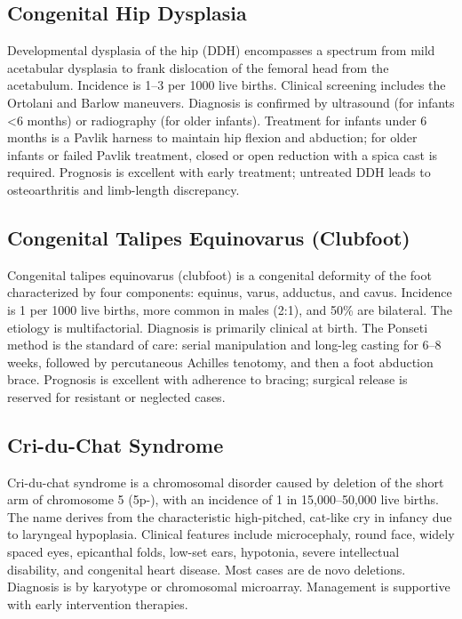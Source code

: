 \subsection{Congenital Hip Dysplasia}
\label{sec:Congenital Hip Dysplasia}
Developmental dysplasia of the hip (DDH) encompasses a spectrum from mild acetabular dysplasia to frank dislocation of the femoral head from the acetabulum. Incidence is 1--3 per 1000 live births. Clinical screening includes the Ortolani and Barlow maneuvers. Diagnosis is confirmed by ultrasound (for infants <6 months) or radiography (for older infants). Treatment for infants under 6 months is a Pavlik harness to maintain hip flexion and abduction; for older infants or failed Pavlik treatment, closed or open reduction with a spica cast is required. Prognosis is excellent with early treatment; untreated DDH leads to osteoarthritis and limb-length discrepancy.

\subsection{Congenital Talipes Equinovarus (Clubfoot)}
\label{sec:Congenital Talipes Equinovarus}
Congenital talipes equinovarus (clubfoot) is a congenital deformity of the foot characterized by four components: equinus, varus, adductus, and cavus. Incidence is 1 per 1000 live births, more common in males (2:1), and 50\% are bilateral. The etiology is multifactorial. Diagnosis is primarily clinical at birth. The Ponseti method is the standard of care: serial manipulation and long-leg casting for 6--8 weeks, followed by percutaneous Achilles tenotomy, and then a foot abduction brace. Prognosis is excellent with adherence to bracing; surgical release is reserved for resistant or neglected cases.

\subsection{Cri-du-Chat Syndrome}
\label{sec:Cri-du-Chat Syndrome}
Cri-du-chat syndrome is a chromosomal disorder caused by deletion of the short arm of chromosome 5 (5p-), with an incidence of 1 in 15,000--50,000 live births. The name derives from the characteristic high-pitched, cat-like cry in infancy due to laryngeal hypoplasia. Clinical features include microcephaly, round face, widely spaced eyes, epicanthal folds, low-set ears, hypotonia, severe intellectual disability, and congenital heart disease. Most cases are de novo deletions. Diagnosis is by karyotype or chromosomal microarray. Management is supportive with early intervention therapies.

